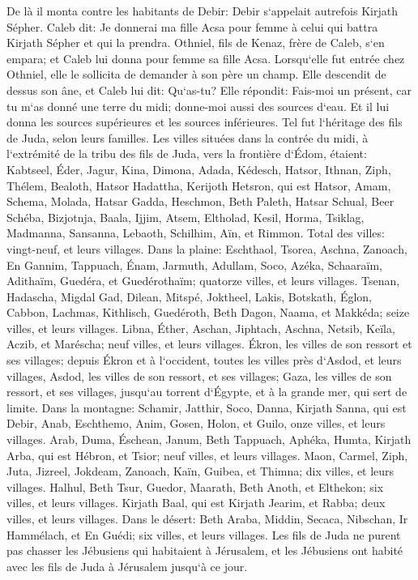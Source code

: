 \verse De là il monta contre les habitants de Debir: Debir s`appelait autrefois Kirjath Sépher. 
\verse Caleb dit: Je donnerai ma fille Acsa pour femme à celui qui battra Kirjath Sépher et qui la prendra. 
\verse Othniel, fils de Kenaz, frère de Caleb, s`en empara; et Caleb lui donna pour femme sa fille Acsa. 
\verse Lorsqu`elle fut entrée chez Othniel, elle le sollicita de demander à son père un champ. Elle descendit de dessus son âne, et Caleb lui dit: Qu`as-tu? 
\verse Elle répondit: Fais-moi un présent, car tu m`as donné une terre du midi; donne-moi aussi des sources d`eau. Et il lui donna les sources supérieures et les sources inférieures. 
\verse Tel fut l`héritage des fils de Juda, selon leurs familles. 
\verse Les villes situées dans la contrée du midi, à l`extrémité de la tribu des fils de Juda, vers la frontière d`Édom, étaient: Kabtseel, Éder, Jagur, 
\verse Kina, Dimona, Adada, 
\verse Kédesch, Hatsor, Ithnan, 
\verse Ziph, Thélem, Bealoth, 
\verse Hatsor Hadattha, Kerijoth Hetsron, qui est Hatsor, 
\verse Amam, Schema, Molada, 
\verse Hatsar Gadda, Heschmon, Beth Paleth, 
\verse Hatsar Schual, Beer Schéba, Bizjotnja, 
\verse Baala, Ijjim, Atsem, 
\verse Eltholad, Kesil, Horma, 
\verse Tsiklag, Madmanna, Sansanna, 
\verse Lebaoth, Schilhim, Aïn, et Rimmon. Total des villes: vingt-neuf, et leurs villages. 
\verse Dans la plaine: Eschthaol, Tsorea, Aschna, 
\verse Zanoach, En Gannim, Tappuach, Énam, 
\verse Jarmuth, Adullam, Soco, Azéka, 
\verse Schaaraïm, Adithaïm, Guedéra, et Guedérothaïm; quatorze villes, et leurs villages. 
\verse Tsenan, Hadascha, Migdal Gad, 
\verse Dilean, Mitspé, Joktheel, 
\verse Lakis, Botskath, Églon, 
\verse Cabbon, Lachmas, Kithlisch, 
\verse Guedéroth, Beth Dagon, Naama, et Makkéda; seize villes, et leurs villages. 
\verse Libna, Éther, Aschan, 
\verse Jiphtach, Aschna, Netsib, 
\verse Keïla, Aczib, et Maréscha; neuf villes, et leurs villages. 
\verse Ékron, les villes de son ressort et ses villages; 
\verse depuis Ékron et à l`occident, toutes les villes près d`Asdod, et leurs villages, 
\verse Asdod, les villes de son ressort, et ses villages; Gaza, les villes de son ressort, et ses villages, jusqu`au torrent d`Égypte, et à la grande mer, qui sert de limite. 
\verse Dans la montagne: Schamir, Jatthir, Soco, 
\verse Danna, Kirjath Sanna, qui est Debir, 
\verse Anab, Eschthemo, Anim, 
\verse Gosen, Holon, et Guilo, onze villes, et leurs villages. 
\verse Arab, Duma, Éschean, 
\verse Janum, Beth Tappuach, Aphéka, 
\verse Humta, Kirjath Arba, qui est Hébron, et Tsior; neuf villes, et leurs villages. 
\verse Maon, Carmel, Ziph, Juta, 
\verse Jizreel, Jokdeam, Zanoach, 
\verse Kaïn, Guibea, et Thimna; dix villes, et leurs villages. 
\verse Halhul, Beth Tsur, Guedor, 
\verse Maarath, Beth Anoth, et Elthekon; six villes, et leurs villages. 
\verse Kirjath Baal, qui est Kirjath Jearim, et Rabba; deux villes, et leurs villages. 
\verse Dans le désert: Beth Araba, Middin, Secaca, 
\verse Nibschan, Ir Hammélach, et En Guédi; six villes, et leurs villages. 
\verse Les fils de Juda ne purent pas chasser les Jébusiens qui habitaient à Jérusalem, et les Jébusiens ont habité avec les fils de Juda à Jérusalem jusqu`à ce jour. 

